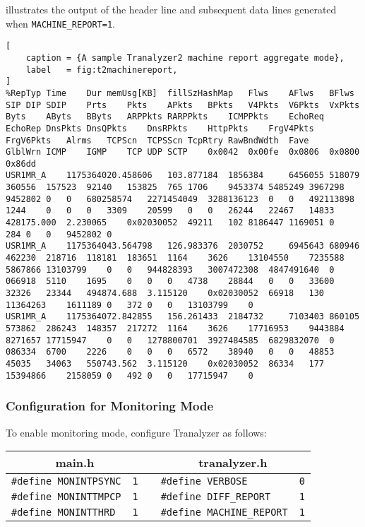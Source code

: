  illustrates the output of the header line and subsequent data lines generated when {\tt MACHINE\_REPORT=1}.
\begin{lstlisting}[
    caption = {A sample Tranalyzer2 machine report aggregate mode},
    label   = fig:t2machinereport,
]
%RepTyp	Time	Dur	memUsg[KB]	fillSzHashMap	Flws	AFlws	BFlws	SIP	DIP	SDIP	Prts	Pkts	APkts	BPkts	V4Pkts	V6Pkts	VxPkts	Byts	AByts	BByts	ARPPkts	RARPPkts	ICMPPkts	EchoReq	EchoRep	DnsPkts	DnsQPkts	DnsRPkts	HttpPkts	FrgV4Pkts	FrgV6Pkts	Alrms	TCPScn	TCPSScn	TcpRtry	RawBndWdth	Fave	GlblWrn	ICMP	IGMP	TCP	UDP	SCTP	0x0042	0x00fe	0x0806	0x0800	0x86dd
USR1MR_A	1175364020.458606	103.877184	1856384		6456055	518079	360556	157523	92140	153825	765	1706	9453374	5485249	3967298	9452802	0	0	680258574	2271454049	3288136123	0	0	492113898	1244	0	0	0	3309	20599	0	0	26244	22467	14833	428175.000	2.230065	0x02030052	49211	102	8186447	1169051	0	284	0	0	9452802	0
USR1MR_A	1175364043.564798	126.983376	2030752		6945643	680946	462230	218716	118181	183651	1164	3626	13104550	7235588	5867866	13103799	0	0	944828393	3007472308	4847491640	0	066918	5110	1695	0	0	0	4738	28844	0	0	33600	32326	23344	494874.688	3.115120	0x02030052	66918	130	11364263	1611189	0	372	0	0	13103799	0
USR1MR_A	1175364072.842855	156.261433	2184732		7103403	860105	573862	286243	148357	217272	1164	3626	17716953	9443884	8271657	17715947	0	0	1278800701	3927484585	6829832070	0	086334	6700	2226	0	0	0	6572	38940	0	0	48853	45035	34063	550743.562	3.115120	0x02030052	86334	177	15394866	2158059	0	492	0	0	17715947	0
\end{lstlisting}

\subsubsection{Configuration for Monitoring Mode}
To enable monitoring mode, configure Tranalyzer as follows:

\begin{longtable}{llcll}
    \toprule
    \multicolumn{2}{c}{\bf main.h}       & \hspace{2cm} & \multicolumn{2}{c}{\bf tranalyzer.h}\\
    \midrule
    {\tt \#define MONINTPSYNC} & {\tt 1} & \hspace{2cm} & {\tt \#define VERBOSE}         & {\tt 0}\\
    {\tt \#define MONINTTMPCP} & {\tt 1} & \hspace{2cm} & {\tt \#define DIFF\_REPORT}    & {\tt 1}\\
    {\tt \#define MONINTTHRD } & {\tt 1} & \hspace{2cm} & {\tt \#define MACHINE\_REPORT} & {\tt 1}\\
    \bottomrule
\end{longtable}

